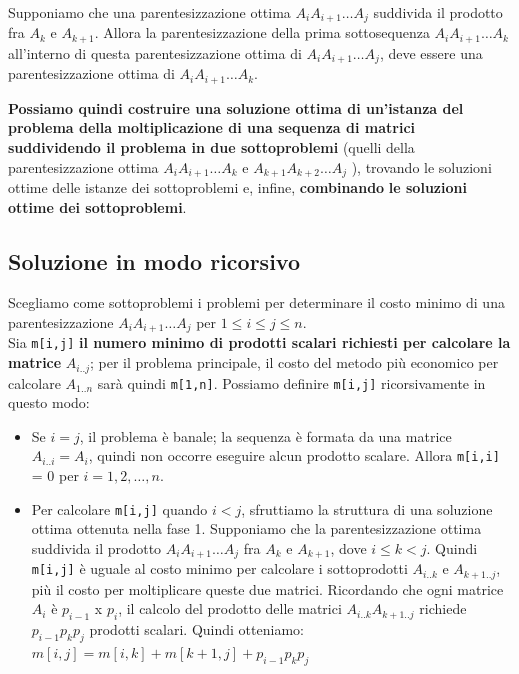 \begin{myblockquote}
  Supponiamo che una parentesizzazione ottima $A_i A_{i+1} \ldots A_j$
  suddivida il prodotto fra $A_k$ e $A_{k+1}$. Allora la
  parentesizzazione della prima sottosequenza $A_i A_{i+1} \ldots A_k$
  all'interno di questa parentesizzazione ottima di
  $A_i A_{i+1} \ldots A_j$, deve essere una parentesizzazione ottima di
  $A_i A_{i+1} \ldots A_k$.
\end{myblockquote}

\textbf{Possiamo quindi costruire una soluzione ottima di un'istanza del
  problema della moltiplicazione di una sequenza di matrici suddividendo
  il problema in due sottoproblemi} (quelli della parentesizzazione ottima
$A_i A_{i+1} \ldots A_k$ e $A_{k+1} A_{k+2} \ldots A_j$ ), trovando le
soluzioni ottime delle istanze dei sottoproblemi e, infine,
\textbf{combinando} \textbf{le soluzioni ottime dei sottoproblemi}.

\subsection{Soluzione in modo ricorsivo}

Scegliamo come sottoproblemi i problemi per determinare il costo minimo
di una parentesizzazione $A_i A_{i+1} \ldots A_j$ per
$1 \le i \le j \le n$.\\ Sia \texttt{m[i,j]} \textbf{il numero
  minimo di prodotti scalari richiesti per calcolare la matrice}
$A_{i..j}$; per il problema principale, il costo del metodo più
economico per calcolare $A_{1..n}$ sarà quindi \texttt{m[1,n]}.
Possiamo definire \texttt{m[i,j]} ricorsivamente in questo modo:
\begin{itemize}
  \item Se $i = j$, il problema è banale; la sequenza è formata da una matrice
        $A_{i..i} = A_i$, quindi non occorre eseguire alcun prodotto scalare.
        Allora \texttt{m[i,i]} = 0 per $i=1,2,\ldots,n$.
  \item Per calcolare \texttt{m[i,j]} quando $i < j$, sfruttiamo la struttura di una
        soluzione ottima ottenuta nella fase 1.
        Supponiamo che la parentesizzazione ottima suddivida il prodotto
        $A_i A_{i+1} \ldots A_j$ fra $A_k$ e $A_{k+1}$, dove $i \le k < j$.
        Quindi \texttt{m[i,j]} è uguale al costo minimo per calcolare i
        sottoprodotti $A_{i..k}$ e $A_{k+1..j}$, più il costo per
        moltiplicare queste due matrici. Ricordando che ogni matrice $A_i$ è
        $p_{i-1}$ x $p_i$, il calcolo del prodotto delle matrici
        $A_{i..k} A_{k+1..j}$ richiede $p_{i-1} p_k p_j$ prodotti scalari.
        Quindi otteniamo: $m[i,j] = m[i,k] + m[k+1,j] + p_{i-1} p_k p_j$
\end{itemize}

